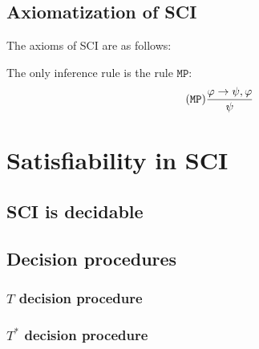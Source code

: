 \documentclass{article}
\theoremstyle{definition}
\newcommand*{\Ts}{T^*}
\newcommand*{\ra}{\rightarrow}
\begin{document}
\subsection{Axiomatization of SCI}

The axioms of SCI are as follows:

The only inference rule is the rule $\texttt{MP}$:
\begin{equation}
    \tag{\texttt{MP}}
    \frac{\varphi \ra \psi, \varphi}{\psi}
\end{equation}

\section{Satisfiability in SCI}
\subsection{SCI is decidable}
\subsection{Decision procedures}
\subsubsection{$T$ decision procedure}
\subsubsection{$\Ts$ decision procedure}
\end{document}
